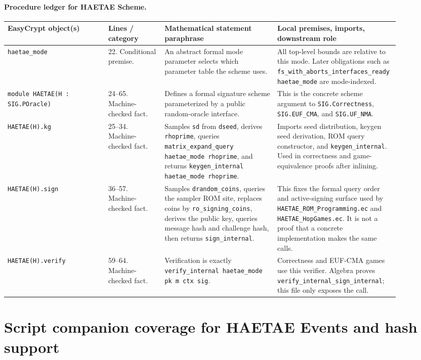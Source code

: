 \documentclass[11pt]{report}
\DeclareRobustCommand{\file}[1]{\ifmmode\text{\nolinkurl{#1}}\else\nolinkurl{#1}\fi}
\DeclareRobustCommand{\ec}[1]{\ifmmode\text{\nolinkurl{#1}}\else\nolinkurl{#1}\fi}
\theoremstyle{definition}
\theoremstyle{plain}
\begin{document}
\paragraph{Procedure ledger for HAETAE Scheme.}
{\footnotesize
\begin{longtable}{p{0.25\linewidth}p{0.14\linewidth}p{0.28\linewidth}p{0.23\linewidth}}
\toprule
\textbf{EasyCrypt object(s)} & \textbf{Lines / category} &
\textbf{Mathematical statement paraphrase} &
\textbf{Local premises, imports, downstream role} \\
\midrule
\ec{haetae\_mode} &
22. Conditional premise. &
An abstract formal mode parameter selects which parameter table the scheme
uses. &
All top-level bounds are relative to this mode.  Later obligations such as
\ec{fs\_with\_aborts\_interfaces\_ready haetae\_mode} are mode-indexed. \\
\midrule
\ec{module HAETAE(H : SIG.POracle)} &
24--65. Machine-checked fact. &
Defines a formal signature scheme parameterized by a public random-oracle
interface. &
This is the concrete scheme argument to \ec{SIG.Correctness},
\ec{SIG.EUF\_CMA}, and \ec{SIG.UF\_NMA}. \\
\midrule
\ec{HAETAE(H).kg} &
25--34. Machine-checked fact. &
Samples \ec{sd} from \ec{dseed}, derives \ec{rhoprime}, queries
\ec{matrix\_expand\_query haetae\_mode rhoprime}, and returns
\ec{keygen\_internal haetae\_mode rhoprime}. &
Imports seed distribution, keygen seed derivation, ROM query constructor, and
\ec{keygen\_internal}.  Used in correctness and game-equivalence proofs after
inlining. \\
\midrule
\ec{HAETAE(H).sign} &
36--57. Machine-checked fact. &
Samples \ec{drandom\_coins}, queries the sampler ROM site, replaces coins by
\ec{ro\_signing\_coins}, derives the public key, queries message hash and
challenge hash, then returns \ec{sign\_internal}. &
This fixes the formal query order and active-signing surface used by
\file{HAETAE\_ROM\_Programming.ec} and \file{HAETAE\_HopGames.ec}.  It is not
a proof that a concrete implementation makes the same calls. \\
\midrule
\ec{HAETAE(H).verify} &
59--64. Machine-checked fact. &
Verification is exactly \ec{verify\_internal haetae\_mode pk m ctx sig}. &
Correctness and EUF-CMA games use this verifier.  Algebra proves
\ec{verify\_internal\_sign\_internal}; this file only exposes the call. \\
\bottomrule
\end{longtable}
}

\section{Script companion coverage for HAETAE Events and hash support}
\end{document}
